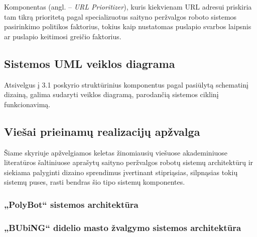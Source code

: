Komponentas (angl. -- \textit{URL Prioritizer}), kuris kiekvienam URL adresui priskiria tam tikrą prioritetą pagal specializuotus saityno peržvalgos roboto sistemos pasirinkimo politikos faktorius, tokius kaip nustatomas puslapio svarbos laipsnis ar puslapio keitimosi greičio faktorius.


\subsection{Sistemos UML veiklos diagrama}

Atsivelgus į 3.1 poskyrio struktūrinius komponentus pagal \cite{StanfWebCrawl} pasiūlytą schematinį dizainą, galima sudaryti veiklos diagramą, parodančią sistemos ciklinį funkcionavimą.



\subsection{Viešai prieinamų realizacijų apžvalga}

Šiame skyriuje apžvelgiamos keletas žinomiausių viešuose akademiniuose literatūros šaltiniuose aprašytų saityno peržvalgos robotų sistemų architektūrų ir siekiama palyginti dizaino sprendimus įvertinant stipriąsias, silpnąsias tokių sistemų puses, rasti bendras šio tipo sistemų komponentes.



\subsubsection{„PolyBot“ sistemos architektūra}
\subsubsection{„BUbiNG“ didelio masto žvalgymo sistemos architektūra}